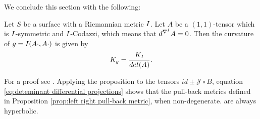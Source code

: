 We conclude this section with the following:

\begin{proposition} \label{prop:Gaussian curvature}
    Let $S$ be a surface with a Riemannian metric $I$. Let $A$ be a $(1,1)$-tensor which is $I$-symmetric and $I$-Codazzi, which means that $d^{\nabla^{I}} A=0$. Then the curvature of $g= I(A \cdot, A \cdot)$ is given by
    \[
        K_g = \frac{K_I}{det(A)}.
    \]
\end{proposition}
For a proof see \cite{Krasnov_2007}. Applying the proposition to the tensors $id \pm \mathcal{J} \circ B$, equation \ref{eq:deteminant differential projections} shows that the pull-back metrics defined in Proposition \ref{prop:left right pull-back metric}, when non-degenerate. are always hyperbolic.